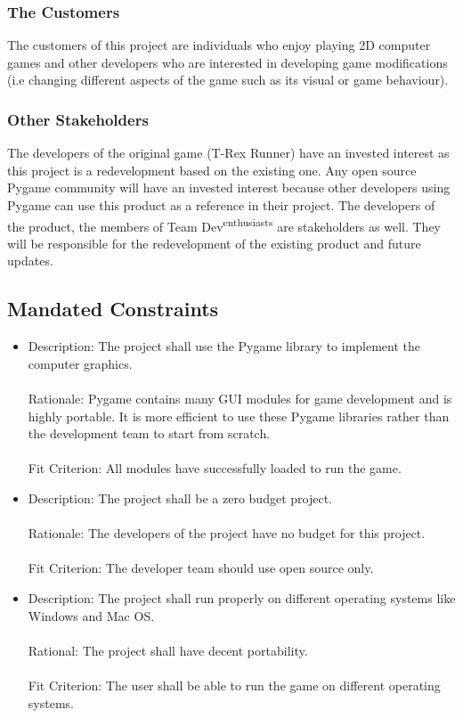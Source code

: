 \documentclass[12pt, titlepage]{article}
\begin{document}
\subsubsection{The Customers}
The customers of this project are individuals who enjoy playing 2D computer games and other developers who are interested in developing game modifications (i.e changing different aspects of the game such as its visual or game behaviour). 

\subsubsection{Other Stakeholders}
The developers of the original game (T-Rex Runner) have an invested interest as this project is a redevelopment based on the existing one. Any open source Pygame community will have an invested interest because other developers using Pygame can use this product as a reference in their project. The developers of the product, the members of Team Dev\textsuperscript{enthusiasts} are stakeholders as well. They will be responsible for the redevelopment of the existing product and future updates.  
\subsection{Mandated Constraints}
\begin{itemize}
    \item Description: The project shall use the Pygame library to implement the computer graphics.\\
          \\Rationale: Pygame contains many GUI modules for game development and is highly portable. It is more efficient to use these Pygame libraries rather than the development team to start from scratch.\\
          \\Fit Criterion: All modules have successfully loaded to run the game.
          
    \item Description: The project shall be a zero budget project.\\
        \\Rationale: The developers of the project have no budget for this project.\\
        \\Fit Criterion: The developer team should use open source only.
    \item Description: The project shall run properly on different operating systems like Windows and Mac OS.\\
        \\Rational: The project shall have decent portability.\\
        \\Fit Criterion: The user shall be able to run the game on different operating systems.
\end{itemize}
\end{document}
